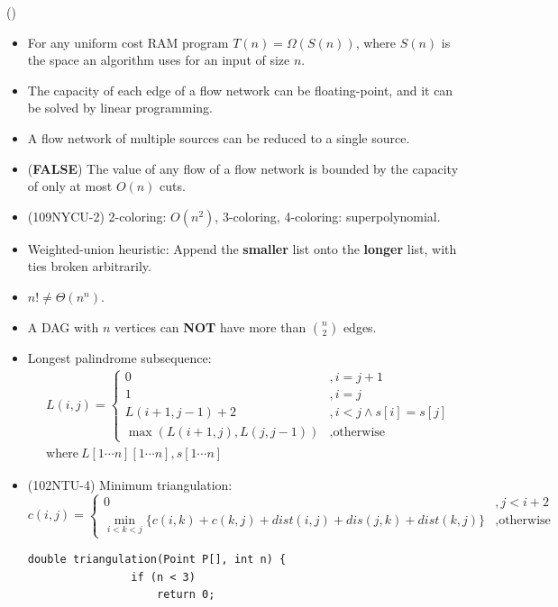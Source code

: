 \item \begin{theorem}{()} \quad\quad
    \begin{itemize}
        \item For any uniform cost RAM program $T(n) = \Omega(S(n))$, where $S(n)$ is the space an algorithm uses for an input of size $n$.
        \item The capacity of each edge of a flow network can be floating-point, and it can be solved by linear programming.
        \item A flow network of multiple sources can be reduced to a single source.
        \item (\textbf{FALSE}) The value of any flow of a flow network is bounded by the capacity of only at most $O(n)$ cuts.
        \item (109NYCU-2) 2-coloring: $O(n^2)$, 3-coloring, 4-coloring: superpolynomial.
        \item Weighted-union heuristic: Append the \textbf{smaller} list onto the \textbf{longer} list, with ties broken arbitrarily.
        \item $n! \neq \Theta(n^n)$.
        \item A DAG with $n$ vertices can \textbf{NOT} have more than $\binom{n}{2}$ edges.
        \item Longest palindrome subsequence: \begin{equation}
            \begin{aligned}
                & L(i, j) = \begin{cases}
                    0 &, i = j + 1 \\
                    1 &, i = j \\
                    L(i + 1, j - 1) + 2 &, i < j \land s[i] = s[j] \\
                    \max(L(i + 1, j), L(j, j - 1)) &, \text{otherwise}
                \end{cases} \\
                & \text{where} \ L[1 \cdots n][1 \cdots n], s[1 \cdots n]
            \end{aligned}
        \end{equation}
        \item (102NTU-4) Minimum triangulation: \begin{equation}
            c(i, j) = \begin{cases}
                0 &, j < i + 2 \\
                \min\limits_{i < k < j}\{c(i, k) + c(k, j) + dist(i, j) + dis(j, k) + dist(k, j)\} &, \text{otherwise}
            \end{cases}
        \end{equation} \begin{lstlisting}[caption={Minimum triangulation.}, captionpos=b]
            double triangulation(Point P[], int n) {
                if (n < 3)
                    return 0;
                

\end{lstlisting}
\end{itemize}
\end{theorem}
